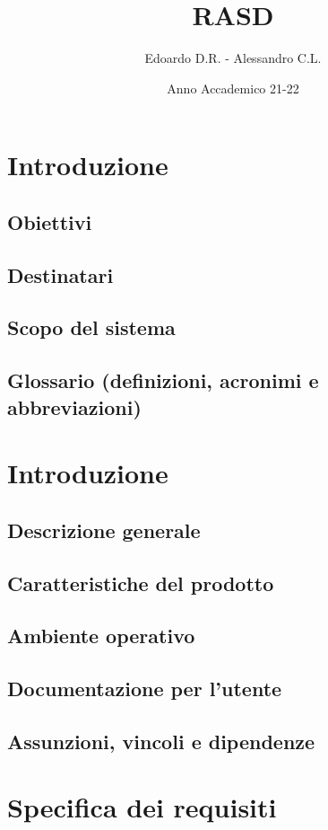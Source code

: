 \documentclass{report}
\begin{document}
\title{RASD}
\author{Edoardo D.R. - Alessandro C.L.}
\date{Anno Accademico 21-22}
\maketitle

\tableofcontents

\chapter{Introduzione}
\section{Obiettivi}
\section{Destinatari}
\section{Scopo del sistema}
\section{Glossario (definizioni, acronimi e abbreviazioni)}


\chapter{Introduzione}
\section{Descrizione generale}
\section{Caratteristiche del prodotto}
\section{Ambiente operativo}
\section{Documentazione per l'utente}
\section{Assunzioni, vincoli e dipendenze}

\chapter{Specifica dei requisiti}
\end{document}
